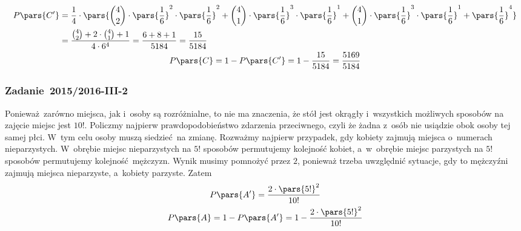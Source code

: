 \begin{enumerate}[label={\Alph*:}]
        \begin{gather*}
            \begin{split}
                P\pars{C'}
                &= \frac{1}{4} \cdot \pars{\binom{4}{2} \cdot \pars{\frac{1}{6}}^2 \cdot \pars{\frac{1}{6}}^2 + \binom{4}{1} \cdot \pars{\frac{1}{6}}^3 \cdot \pars{\frac{1}{6}}^1 + \binom{4}{1} \cdot \pars{\frac{1}{6}}^3 \cdot \pars{\frac{1}{6}}^1 + \pars{\frac{1}{6}}^4}\\
                &= \frac{\binom{4}{2} + 2 \cdot \binom{4}{1} + 1}{4 \cdot 6^4}
                = \frac{6 + 8 + 1}{5184}
                = \frac{15}{5184}
            \end{split}\\
            P\pars{C}
            = 1 - P\pars{C'}
            = 1 - \frac{15}{5184}
            = \frac{5169}{5184}
        \end{gather*}
\end{enumerate}
\subsubsection*{Zadanie~2015/2016-III-2}
Ponieważ zarówno miejsca, jak i~osoby są rozróżnialne, to nie ma znaczenia, że stół jest okrągły i~wszystkich możliwych sposobów na zajęcie miejsc jest \(10!\). Policzmy najpierw prawdopodobieństwo zdarzenia przeciwnego, czyli że żadna z~osób nie usiądzie obok osoby tej samej płci. W~tym celu osoby muszą siedzieć na zmianę. Rozważmy najpierw przypadek, gdy kobiety zajmują miejsca o~numerach nieparzystych. W~obrębie miejsc nieparzystych na \(5!\) sposobów permutujemy kolejność kobiet, a~w~obrębie miejsc parzystych na \(5!\) sposobów permutujemy kolejność mężczyzn. Wynik musimy pomnożyć przez \(2\), ponieważ trzeba uwzględnić sytuacje, gdy to mężczyźni zajmują miejsca nieparzyste, a~kobiety parzyste. Zatem
\begin{gather*}
    P\pars{A'}
    = \frac{2 \cdot \pars{5!}^2}{10!}\\
    P\pars{A}
    = 1 - P\pars{A'}
    = 1 - \frac{2 \cdot \pars{5!}^2}{10!}
\end{gather*}
